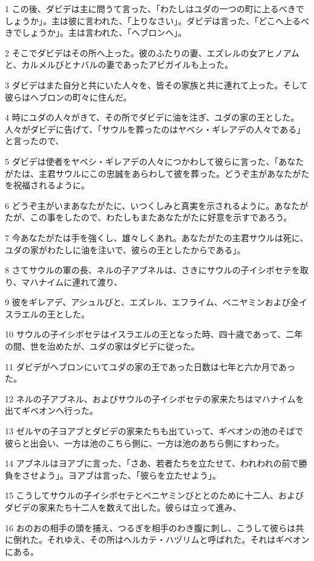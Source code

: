\par 1 この後、ダビデは主に問うて言った、「わたしはユダの一つの町に上るべきでしょうか」。主は彼に言われた、「上りなさい」。ダビデは言った、「どこへ上るべきでしょうか」。主は言われた、「ヘブロンへ」。
\par 2 そこでダビデはその所へ上った。彼のふたりの妻、エズレルの女アヒノアムと、カルメルびとナバルの妻であったアビガイルも上った。
\par 3 ダビデはまた自分と共にいた人々を、皆その家族と共に連れて上った。そして彼らはヘブロンの町々に住んだ。
\par 4 時にユダの人々がきて、その所でダビデに油を注ぎ、ユダの家の王とした。人々がダビデに告げて、「サウルを葬ったのはヤベシ・ギレアデの人々である」と言ったので、
\par 5 ダビデは使者をヤベシ・ギレアデの人々につかわして彼らに言った、「あなたがたは、主君サウルにこの忠誠をあらわして彼を葬った。どうぞ主があなたがたを祝福されるように。
\par 6 どうぞ主がいまあなたがたに、いつくしみと真実を示されるように。あなたがたが、この事をしたので、わたしもまたあなたがたに好意を示すであろう。
\par 7 今あなたがたは手を強くし、雄々しくあれ。あなたがたの主君サウルは死に、ユダの家がわたしに油を注いで、彼らの王としたからである」。
\par 8 さてサウルの軍の長、ネルの子アブネルは、さきにサウルの子イシボセテを取り、マハナイムに連れて渡り、
\par 9 彼をギレアデ、アシュルびと、エズレル、エフライム、ベニヤミンおよび全イスラエルの王とした。
\par 10 サウルの子イシボセテはイスラエルの王となった時、四十歳であって、二年の間、世を治めたが、ユダの家はダビデに従った。
\par 11 ダビデがヘブロンにいてユダの家の王であった日数は七年と六か月であった。
\par 12 ネルの子アブネル、およびサウルの子イシボセテの家来たちはマハナイムを出てギベオンへ行った。
\par 13 ゼルヤの子ヨアブとダビデの家来たちも出ていって、ギベオンの池のそばで彼らと出会い、一方は池のこちら側に、一方は池のあちら側にすわった。
\par 14 アブネルはヨアブに言った、「さあ、若者たちを立たせて、われわれの前で勝負をさせよう」。ヨアブは言った、「彼らを立たせよう」。
\par 15 こうしてサウルの子イシボセテとベニヤミンびととのために十二人、およびダビデの家来たち十二人を数えて出した。彼らは立って進み、
\par 16 おのおの相手の頭を捕え、つるぎを相手のわき腹に刺し、こうして彼らは共に倒れた。それゆえ、その所はヘルカテ・ハヅリムと呼ばれた。それはギベオンにある。
